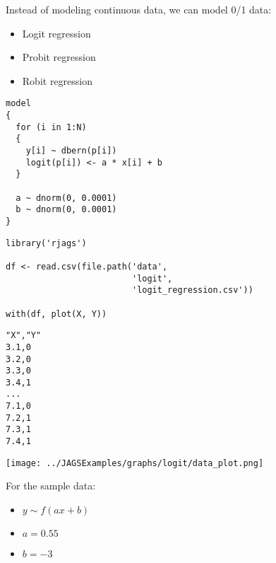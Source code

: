 \documentclass{beamer}
\begin{document}
\begin{frame}[fragile]
  Instead of modeling continuous data, we can model 0/1 data:
  \begin{itemize}
    \item{Logit regression}
    \item{Probit regression}
    \item{Robit regression}
  \end{itemize}
\end{frame}

\begin{frame}[fragile]
  \begin{verbatim}
model
{
  for (i in 1:N)
  {
    y[i] ~ dbern(p[i])
    logit(p[i]) <- a * x[i] + b
  }
  
  a ~ dnorm(0, 0.0001)
  b ~ dnorm(0, 0.0001)
}
  \end{verbatim}
\end{frame}

\begin{frame}[fragile]
  \begin{verbatim}
library('rjags')

df <- read.csv(file.path('data',
                         'logit',
                         'logit_regression.csv'))

with(df, plot(X, Y))
  \end{verbatim}
\end{frame}

\begin{frame}[fragile]
  \begin{verbatim}
"X","Y"
3.1,0
3.2,0
3.3,0
3.4,1
...
7.1,0
7.2,1
7.3,1
7.4,1
  \end{verbatim}
\end{frame}

\begin{frame}[fragile]
  \begin{center}
    \texttt{[image: ../JAGSExamples/graphs/logit/data\_plot.png]}
  \end{center}
\end{frame}

\begin{frame}
  For the sample data:
  \begin{itemize}
    \item{$y \sim f(ax + b)$}
    \item{$a = 0.55$}
    \item{$b = -3$}
  \end{itemize}
\end{frame}
\end{document}
